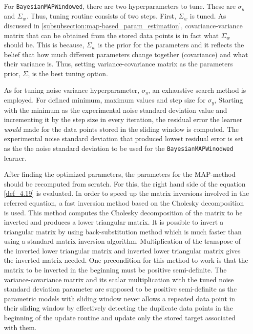 For \texttt{BayesianMAPWindowed}, there are two hyperparameters to tune. These are $\sigma_y$ and $\Sigma_w$. Thus, tuning routine consists of two steps. First, $\Sigma_w$ is tuned. As discussed in \ref{subsubsection:map-based_param_estimation}, covariance-variance matrix that can be obtained from the stored data points is in fact what $\Sigma_w$ should be. This is because, $\Sigma_w$ is the prior for the parameters and it reflects the belief that how much different parameters change together (covariance) and what their variance is. Thus, setting variance-covariance matrix as the parameters prior, $\Sigma$, is the best tuning option.

As for tuning noise variance hyperparameter, $\sigma_y$, an exhaustive search method is employed. For defined minimum, maximum values and step size for $\sigma_y$, Starting with the minimum as the experimental noise standard deviation value and incrementing it by the step size in every iteration, the residual error the learner \textit{would} made for the data points stored in the sliding window is computed. The experimental noise standard deviation that produced lowest residual error is set as the the noise standard deviation to be used for the \texttt{BayesianMAPWinodwed} learner. 

After finding the optimized parameters, the parameters for the MAP-method should be recomputed from scratch. For this, the right hand side of the equation \ref{def_4.19} is evaluated. In order to speed up the matrix inversions involved in the referred equation, a fast inversion method based on the Cholesky decomposition is used. This method computes the Cholesky decomposition of the matrix to be inverted and produces a lower triangular matrix. It is possible to invert a triangular matrix by using back-substitution method which is much faster than using a standard matrix inversion algorithm. Multiplication of the transpose of the inverted lower triangular matrix and inverted lower triangular matrix gives the inverted matrix needed. One precondition for this method to work is that the matrix to be inverted in the beginning must be positive semi-definite. The variance-covariance matrix and its scalar multiplication with the tuned noise standard deviation parameter are supposed to be positive semi-definite as the parametric models with sliding window never allows a repeated data point in their sliding window by effectively detecting the duplicate data points in the beginning of the update routine and update only the stored target associated with them.

